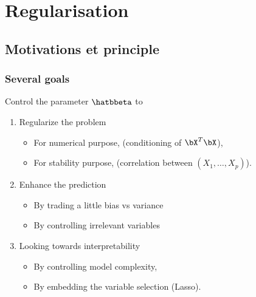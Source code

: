 \documentclass{beamer}\usepackage[]{graphicx}\usepackage[]{color}
\begin{document}
\section{Regularisation}
 

\subsection{Motivations et principle}

\begin{frame}
  \frametitle{Several goals}

  Control the parameter $\hatbbeta$ to

  \begin{enumerate}
  \item \alert{Regularize} the problem
    \begin{itemize}
    \item For numerical purpose, (conditioning of $\bX^T\bX$),
    \item     For    stability    purpose,     (correlation    between
      $(X_1,\dots,X_p)$).
    \end{itemize}
  \item \alert{Enhance} the prediction
    \begin{itemize}
    \item By trading a little bias vs variance
    \item By controlling irrelevant variables
    \end{itemize}
  \item \alert{Looking towards} interpretability
    \begin{itemize}
    \item By controlling model complexity,
    \item By embedding the variable selection (Lasso).
    \end{itemize}
  \end{enumerate}

\end{frame}

\end{document}
